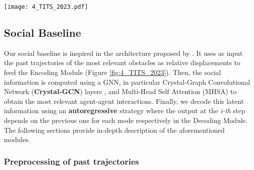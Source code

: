 \begin{figure*}[!ht]
	\centering
	\setlength{\tabcolsep}{2.0pt}
	\texttt{[image: 4\_TITS\_2023.pdf]}
	\caption{Overview of our final Motion Prediction model (\textbf{\textcolor{blue}{Blue links}} and \textbf{\textcolor{red}{Red links}} represent \textbf{\textcolor{blue}{Social}} and \textbf{\textcolor{red}{Map}} information respectively). We distinguish three main blocks: 1) \textbf{Encoding module}, which uses plausible HD Map information (specific centerlines and driveable area around) and agents past trajectories to compute the motion and physical latent features, 2) \textbf{Social Attention module}, which calculates the interaction among the different agents and returns the most relevant social features, 3) \textbf{Decoding module}, responsible for calculating the multimodal prediction by means of an auto-regressive strategy concatenating low-level map features and social features as a baseline, as well as iterating over the different latent centerlines for specific physical information per mode.}
	\label{fig:4_TITS_2023}
\end{figure*}

\subsection{Social Baseline}
\label{subsec:4_efficient_baselines_social}

Our social baseline is inspired in the architecture proposed by \cite{schmidt2022crat}. It uses as input the past trajectories of the most relevant obstacles as relative displacements to feed the Encoding Module (Figure \ref{fig:4_TITS_2023}). Then, the social information is computed using a \ac{GNN}, in particular Crystal-Graph Convolutional Network (\textbf{Crystal-GCN}) layers \cite{xie2018crystal, schmidt2022crat}, and Multi-Head Self Attention (MHSA) \cite{vaswani2017attention} to obtain the most relevant agent-agent interactions. Finally, we decode this latent information using an \textbf{autoregressive} strategy where the output at the \textit{i-th} step depends on the previous one for each mode respectively in the Decoding Module. The following sections provide in-depth description of the aforementioned modules.

\subsubsection{Preprocessing of past trajectories}
\label{subsubsec:4_efficient_baselines_social_preprocessing}

